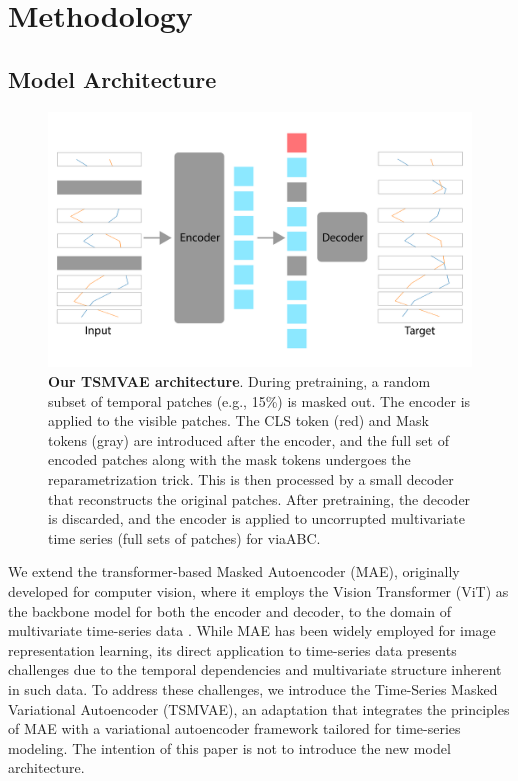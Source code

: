 \documentclass[12pt]{article} %
\begin{document}

\section{Methodology}
\subsection{Model Architecture}
\begin{figure}
    \centering
    \includegraphics[width=0.75\linewidth]{figures/model_architecture.png}
    \caption{\textbf{Our TSMVAE architecture}. During pretraining, a random subset of temporal patches (e.g., 15\%) is masked out. The encoder is applied to the visible patches. The CLS token (red) and Mask tokens (gray) are introduced after the encoder, and the full set of encoded patches along with the mask tokens undergoes the reparametrization trick. This is then processed by a small decoder that reconstructs the original patches. After pretraining, the decoder is discarded, and the encoder is applied to uncorrupted multivariate time series (full sets of patches) for viaABC.}
    \label{fig:enter-label}
\end{figure}
We extend the transformer-based Masked Autoencoder (MAE), originally developed for computer vision, where it employs the Vision Transformer (ViT) as the backbone model for both the encoder and decoder, to the domain of multivariate time-series data \citep{dosovitskiy2020image, he2022masked}. While MAE has been widely employed for image representation learning, its direct application to time-series data presents challenges due to the temporal dependencies and multivariate structure inherent in such data. To address these challenges, we introduce the Time-Series Masked Variational Autoencoder (TSMVAE), an adaptation that integrates the principles of MAE with a variational autoencoder framework tailored for time-series modeling. The intention of this paper is not to introduce the new model architecture.
\end{document}
